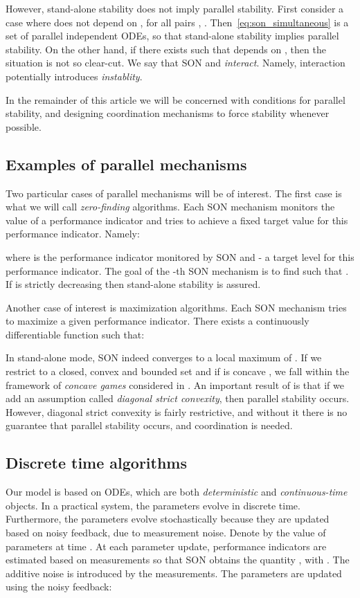 \documentclass[10pt,conference,letterpaper]{IEEEtran}
\begin{document}
	However, stand-alone stability does not imply parallel stability. First consider a case where  does not depend on , for all pairs  , . Then~\eqref{eq:son_simultaneous} is a set of  parallel independent \acp{ODE}, so that stand-alone stability implies parallel stability. On the other hand, if there exists  such that  depends on , then the situation is not so clear-cut. We say that \ac{SON}  and  \emph{interact}. Namely, interaction potentially introduces \emph{instablity}.
	
	In the remainder of this article we will be concerned with conditions for parallel stability, and designing coordination mechanisms to force stability whenever possible.
\subsection{Examples of parallel mechanisms}
	Two particular cases of parallel mechanisms will be of interest. The first case is what we will call \emph{zero-finding} algorithms. Each \ac{SON} mechanism monitors the value of a performance indicator and tries to achieve a fixed target value for this performance indicator. Namely:

	where  is the performance indicator monitored by \ac{SON}  and  - a target level for this performance indicator. The goal of the -th \ac{SON} mechanism is to find  such that . If  is strictly decreasing  then stand-alone stability is assured. 

	Another case of interest is maximization algorithms. Each \ac{SON} mechanism tries to maximize a given performance indicator. There exists a continuously differentiable function  such that:

	In stand-alone mode, \ac{SON}  indeed converges to a local maximum of . If we restrict  to a closed, convex and bounded set and if  is concave  , we fall within the framework of \emph{concave games} considered in \cite{RosenConvexGame}. An important result of \cite{RosenConvexGame} is that if we add an assumption called \emph{diagonal strict convexity}, then parallel stability occurs. However, diagonal strict convexity is fairly restrictive, and without it there is no guarantee that parallel stability occurs, and coordination is needed.
\subsection{Discrete time algorithms}
	Our model is based on \acp{ODE}, which are both \emph{deterministic} and \emph{continuous-time} objects. In a practical system, the parameters evolve in discrete time. Furthermore, the parameters evolve stochastically because they are updated based on noisy feedback, due to measurement noise. Denote by  the value of parameters at time . At each parameter update, performance indicators are estimated based on measurements so that \ac{SON}  obtains the quantity , with . The additive noise  is introduced by the measurements. The parameters are updated using the noisy feedback:
\end{document}
